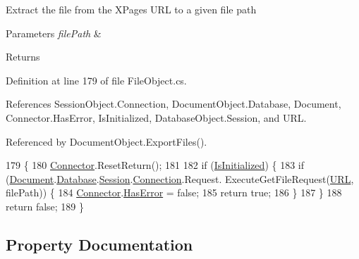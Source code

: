 Extract the file from the X\+Pages U\+RL to a given file path 


\begin{DoxyParams}{Parameters}
{\em file\+Path} & \\
\hline
\end{DoxyParams}
\begin{DoxyReturn}{Returns}

\end{DoxyReturn}


Definition at line 179 of file File\+Object.\+cs.



References Session\+Object.\+Connection, Document\+Object.\+Database, Document, Connector.\+Has\+Error, Is\+Initialized, Database\+Object.\+Session, and U\+RL.



Referenced by Document\+Object.\+Export\+Files().


\begin{DoxyCode}
179                                              \{
180         \mbox{\hyperlink{class_connector}{Connector}}.ResetReturn();
181 
182         \textcolor{keywordflow}{if} (\mbox{\hyperlink{class_file_object_a36ff6c07d0662885402bfe7d98cf2988}{IsInitialized}}) \{
183             \textcolor{keywordflow}{if} (\mbox{\hyperlink{class_file_object_a0c9650a6ae1efb95f8211f9fa3b883fe}{Document}}.\mbox{\hyperlink{class_document_object_a69d5338c9835f748490323d2950eed09}{Database}}.\mbox{\hyperlink{class_database_object_aa8484162b7d2a7c4c9426bca13c64c07}{Session}}.\mbox{\hyperlink{class_session_object_a014bdbf705a753540e19bfb53030c55c}{Connection}}.Request.
      ExecuteGetFileRequest(\mbox{\hyperlink{class_file_object_a7355eaeea3fe40bd8862d7f1f9b479da}{URL}}, filePath)) \{
184                 \mbox{\hyperlink{class_connector}{Connector}}.\mbox{\hyperlink{class_connector_a9365777a6b7b711b75bcfa6c4d53e989}{HasError}} = \textcolor{keyword}{false};
185                 \textcolor{keywordflow}{return} \textcolor{keyword}{true};
186             \}
187         \}
188         \textcolor{keywordflow}{return} \textcolor{keyword}{false};
189     \}
\end{DoxyCode}


\subsection{Property Documentation}
\mbox{\label{class_file_object_a39640cdc4b16ee66e9c73803f4510396}} 
